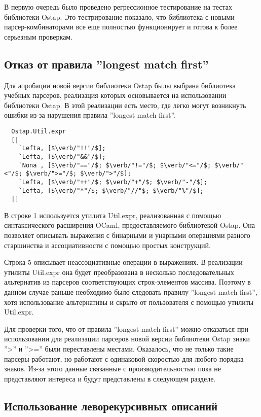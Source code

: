 \documentclass[conference]{IEEEtran}
\begin{document}
В первую очередь было проведено регрессионное тестирование на тестах библиотеки Ostap. Это тестрирование показало, что библиотека с новыми парсер-комбинаторами все еще полностью функционирует и готова к более серьезным проверкам.

\subsection{Отказ от правила ''longest match first''}

Для апробации новой версии библиотеки Ostap былы выбрана библиотека учебных парсеров, реализация которых основывается на использовании библиотеки Ostap. В этой реализации есть место, где легко могут возникнуть ошибки из-за нарушения правила ''longest match first''.

\begin{lstlisting}
  Ostap.Util.expr
  [|                
    `Lefta, [$\verb/"!!"/$];
    `Lefta, [$\verb/"&&"/$];
    `Nona , [$\verb/"=="/$; $\verb/"!="/$; $\verb/"<="/$; $\verb/"<"/$; $\verb/">="/$; $\verb/">"/$];
    `Lefta, [$\verb/"++"/$; $\verb/"+"/$; $\verb/"-"/$];
    `Lefta, [$\verb/"*"/$; $\verb/"//"$; $\verb/"%"/$];
  |] 
\end{lstlisting}

В строке 1 используется утилита Util.expr, реализованная с помощью синтаксического расширения OCaml, предоставляемого библиотекой Ostap. Она позволяет описывать выражения с бинарными и унарными операциями разного старшинства и ассоциативности с помощью простых конструкций.

Строка 5 описывает неассоциативные операции в выражениях. В реализации утилиты Util.expr она будет преобразована в несколько последовательных альтернатив из парсеров соответствующих строк-элементов массива. Поэтому в данном случае раньше необходимо было следовать правилу ''longest match first'', хотя использование альтернативы и скрыто от пользователя с помощью утилиты Util.expr.

Для проверки того, что от правила ''longest match first'' можно отказаться при использовании для реализации парсеров новой версии библиотеки Ostap знаки ''>'' и ''>='' были переставлены местами. Оказалось, что не только такие парсеры работают, но работают с одинаковой скоростью для любого порядка знаков. Из-за этого данные связанные с производительностью пока не представляют интереса и будут представлены в следующем разделе.

\subsection{Использование леворекурсивных описаний}
\end{document}
